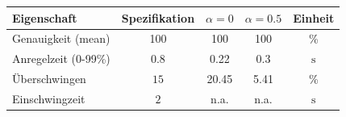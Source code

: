 \begin{table}[h!]
	\centering
	\begin{tabular}{l c c c c}
		Eigenschaft
			& Spezifikation
			& $\alpha = 0$
			& $\alpha = 0.5$
			& Einheit \\
		\hline
		Genauigkeit (mean)
			& 100
			& 100
			& 100
			& \% \\
		Anregelzeit (0-99\%)
			& $0.8$
			& 0.22
			& 0.3
			& $\si{\second}$ \\
		Überschwingen
			& $15$
			& 20.45 
			& 5.41 
			& \% \\
		Einschwingzeit
			& $2$
			& n.a. 
			& n.a.
			& $\si{\second}$ \\
	\end{tabular}
\end{table}
